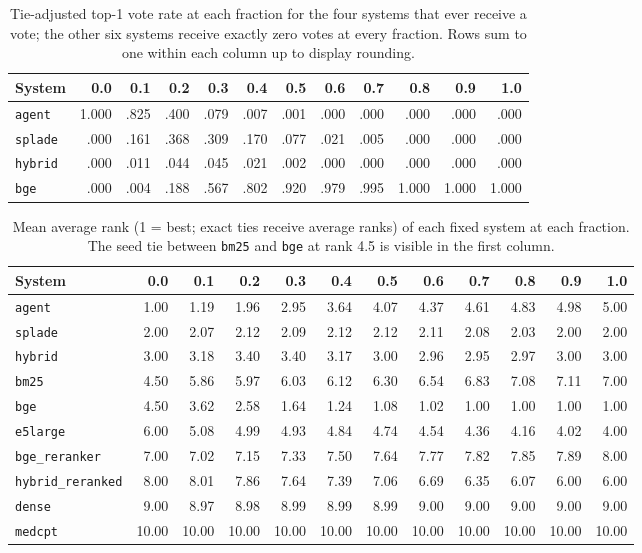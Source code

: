 \begin{table}[h]
\centering
\small
\caption{Tie-adjusted top-1 vote rate at each fraction for the four systems that ever receive a vote; the other six systems receive exactly zero votes at every fraction. Rows sum to one within each column up to display rounding.}
\label{tab:gridvotes}
\setlength{\tabcolsep}{3.6pt}
\begin{tabular}{@{}lrrrrrrrrrrr@{}}
\toprule
System & 0.0 & 0.1 & 0.2 & 0.3 & 0.4 & 0.5 & 0.6 & 0.7 & 0.8 & 0.9 & 1.0 \\
\midrule
\texttt{agent} & 1.000 & .825 & .400 & .079 & .007 & .001 & .000 & .000 & .000 & .000 & .000 \\
\texttt{splade} & .000 & .161 & .368 & .309 & .170 & .077 & .021 & .005 & .000 & .000 & .000 \\
\texttt{hybrid} & .000 & .011 & .044 & .045 & .021 & .002 & .000 & .000 & .000 & .000 & .000 \\
\texttt{bge} & .000 & .004 & .188 & .567 & .802 & .920 & .979 & .995 & 1.000 & 1.000 & 1.000 \\
\bottomrule
\end{tabular}
\end{table}

\begin{table}[h]
\centering
\small
\caption{Mean average rank (1 = best; exact ties receive average ranks) of each fixed system at each fraction. The seed tie between \texttt{bm25} and \texttt{bge} at rank 4.5 is visible in the first column.}
\label{tab:gridranks}
\setlength{\tabcolsep}{3.6pt}
\begin{tabular}{@{}lrrrrrrrrrrr@{}}
\toprule
System & 0.0 & 0.1 & 0.2 & 0.3 & 0.4 & 0.5 & 0.6 & 0.7 & 0.8 & 0.9 & 1.0 \\
\midrule
\texttt{agent} & 1.00 & 1.19 & 1.96 & 2.95 & 3.64 & 4.07 & 4.37 & 4.61 & 4.83 & 4.98 & 5.00 \\
\texttt{splade} & 2.00 & 2.07 & 2.12 & 2.09 & 2.12 & 2.12 & 2.11 & 2.08 & 2.03 & 2.00 & 2.00 \\
\texttt{hybrid} & 3.00 & 3.18 & 3.40 & 3.40 & 3.17 & 3.00 & 2.96 & 2.95 & 2.97 & 3.00 & 3.00 \\
\texttt{bm25} & 4.50 & 5.86 & 5.97 & 6.03 & 6.12 & 6.30 & 6.54 & 6.83 & 7.08 & 7.11 & 7.00 \\
\texttt{bge} & 4.50 & 3.62 & 2.58 & 1.64 & 1.24 & 1.08 & 1.02 & 1.00 & 1.00 & 1.00 & 1.00 \\
\texttt{e5large} & 6.00 & 5.08 & 4.99 & 4.93 & 4.84 & 4.74 & 4.54 & 4.36 & 4.16 & 4.02 & 4.00 \\
\texttt{bge\_reranker} & 7.00 & 7.02 & 7.15 & 7.33 & 7.50 & 7.64 & 7.77 & 7.82 & 7.85 & 7.89 & 8.00 \\
\texttt{hybrid\_reranked} & 8.00 & 8.01 & 7.86 & 7.64 & 7.39 & 7.06 & 6.69 & 6.35 & 6.07 & 6.00 & 6.00 \\
\texttt{dense} & 9.00 & 8.97 & 8.98 & 8.99 & 8.99 & 8.99 & 9.00 & 9.00 & 9.00 & 9.00 & 9.00 \\
\texttt{medcpt} & 10.00 & 10.00 & 10.00 & 10.00 & 10.00 & 10.00 & 10.00 & 10.00 & 10.00 & 10.00 & 10.00 \\
\bottomrule
\end{tabular}
\end{table}

